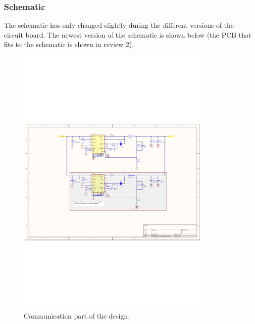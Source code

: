 \subsubsection{Schematic}
The schematic has only changed slightly during the different versions of the circuit board. The newest version of the schematic is shown below (the PCB that fits to the schematic is shown in review 2).
\begin{figure}[H]
	\begin{centering}
		 \includegraphics[width=0.85\textwidth,page=2,angle=0]{images/SIG60_v0_4}
		\caption{Communication part of the design.}
	\end{centering}
\end{figure}

